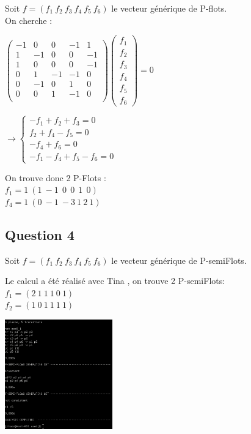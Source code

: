Soit $f=(f_1\ f_2\ f_3\ f_4\ f_5\ f_6)$ le vecteur générique de P-flots.\\
On cherche : 
\begin{center}
$\begin{pmatrix}
-1 & 0 & 0 & -1 & 1\\
 1 & -1 & 0 & 0 & -1\\
 1 & 0 & 0 & 0 & -1\\
 0 & 1 & -1 & -1 & 0\\
 0 & -1 & 0 & 1 & 0\\ 
 0 & 0 & 1 & -1 & 0\\
\end{pmatrix}
\begin{pmatrix}
f_1\\
f_2\\ 
f_3\\ 
f_4\\ 
f_5\\ 
f_6
\end{pmatrix}
=0
$

\vspace{0.5cm}

$\rightarrow 
\begin{cases}
-f_1 + f_2 + f_3 = 0\\
f_2 + f_4 - f_5  = 0\\
-f_4 + f_6  = 0\\
-f_1 - f_4 + f_5 - f_6 = 0
\end{cases}$

\vspace{0.5cm}
On trouve donc 2 P-Flots :\\
$
f_1 = 1 \ (1 \ -1 \ \ 0 \ \ 0 \ \ 1 \ \ 0)
$
\\
$
f_4 = 1 \ (0 \ -1 \ -3 \ 1 \ 2 \ 1)
$

\end{center}
\subsection{Question 4}
Soit $f=(f_1\ f_2\ f_3\ f_4\ f_5\ f_6)$ le vecteur générique de P-semiFlots.\\
\begin{center}
Le calcul a été réalisé avec Tina , on trouve 2 P-semiFlots: \\
$f_1 = (2\ 1\ 1\ 1\ 0\ 1)$\\
$f_2 = (1\ 0\ 1\ 1\ 1\ 1)$

\vspace{0.5cm}

\includegraphics[width=0.35\textwidth]{images/screenTinaExo5.png}\\
\end{center}

